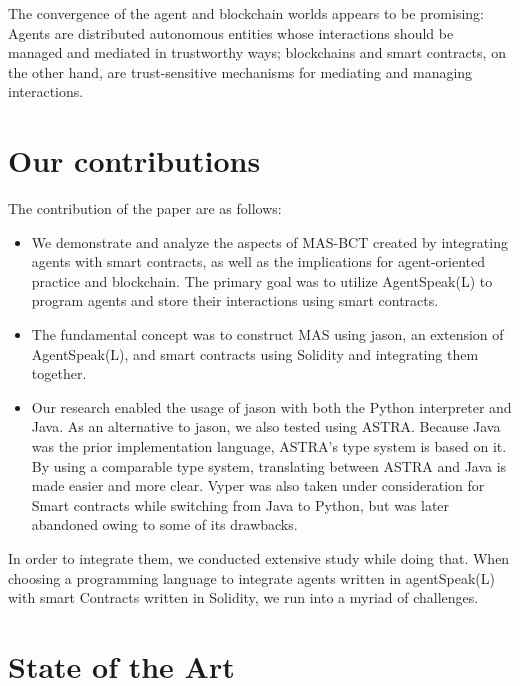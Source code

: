 \vspace{.5cm}
The convergence of the agent and blockchain worlds appears to be promising: Agents are distributed autonomous entities whose interactions should be managed and mediated in trustworthy ways; blockchains and smart contracts, on the other hand, are trust-sensitive mechanisms for mediating and managing interactions.

\section{Our contributions}

The contribution of the paper are as follows:

\begin{itemize}

    \item We demonstrate and analyze the aspects of \ac{MAS}-\ac{BCT} created by integrating agents with smart contracts, as well as the implications for agent-oriented practice and blockchain. The primary goal was to utilize AgentSpeak(L) to program agents and store their interactions using smart contracts.
    
    \item  The fundamental concept was to construct \ac{MAS} using jason, an extension of AgentSpeak(L), and smart contracts using Solidity and integrating them together.
    
    \item Our research enabled the usage of jason with both the Python interpreter and Java. As an alternative to jason, we also tested using \ac{ASTRA}. Because Java was the prior implementation language, \ac{ASTRA}'s type system is based on it. By using a comparable type system, translating between \ac{ASTRA} and Java is made easier and more clear. Vyper was also taken under consideration for Smart contracts while switching from Java to Python, but was later abandoned owing to some of its drawbacks.
    
\end{itemize}

In order to integrate them, we conducted extensive study while doing that. When choosing a programming language to integrate agents written in agentSpeak(L) with smart Contracts written in Solidity, we run into a myriad of challenges.

\section{State of the Art}

